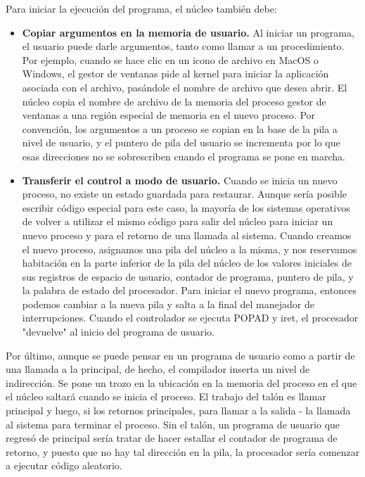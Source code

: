 \documentclass[10pt]{book}
\begin{document}
Para iniciar la ejecución del programa, el núcleo también debe:
\begin{itemize}
\item \textbf{Copiar argumentos en la memoria de usuario.} Al iniciar un programa, el usuario puede darle argumentos, tanto como llamar a un procedimiento. Por ejemplo, cuando se hace clic en un icono de archivo en MacOS o Windows, el gestor de ventanas pide al kernel para iniciar la aplicación asociada con el archivo, pasándole el nombre de archivo que desea abrir. El núcleo copia el nombre de archivo de la memoria del proceso gestor de ventanas a una región especial de memoria en el nuevo proceso. Por convención, los argumentos a un proceso se copian en la base de la pila a nivel de usuario, y el puntero de pila del usuario se incrementa por lo que esas direcciones no se sobrescriben cuando el programa se pone en marcha.

\item \textbf{Transferir el control a modo de usuario.} Cuando se inicia un nuevo proceso, no existe un estado guardada para restaurar. Aunque sería posible escribir código especial para este caso, la mayoría de los sistemas operativos de volver a utilizar el mismo código para salir del núcleo para iniciar un nuevo proceso y para el retorno de una llamada al sistema. Cuando creamos el nuevo proceso, asignamos una pila del núcleo a la misma, y nos reservamos habitación en la parte inferior de la pila del núcleo de los valores iniciales de sus registros de espacio de usuario, contador de programa, puntero de pila, y la palabra de estado del procesador. Para iniciar el nuevo programa, entonces podemos cambiar a la nueva pila y salta a la final del manejador de interrupciones. Cuando el controlador se ejecuta POPAD y iret, el procesador "devuelve" al inicio del programa de usuario.
\end{itemize}

Por último, aunque se puede pensar en un programa de usuario como a partir de una llamada a la principal, de hecho, el compilador inserta un nivel de indirección. Se pone un trozo en la ubicación en la memoria del proceso en el que el núcleo saltará cuando se inicia el proceso. El trabajo del talón es llamar principal y luego, si los retornos principales, para llamar a la salida - la llamada al sistema para terminar el proceso. Sin el talón, un programa de usuario que regresó de principal sería tratar de hacer estallar el contador de programa de retorno, y puesto que no hay tal dirección en la pila, la
procesador sería comenzar a ejecutar código aleatorio.
\end{document}
